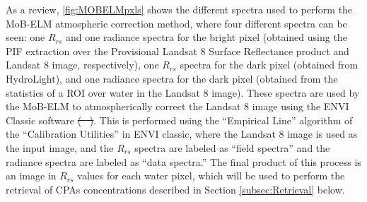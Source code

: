 \documentclass[onecolumn,3p,letterpaper,11pt]{elsarticle} %
\providecommand{\DIFaddtex}[1]{{\protect\color{blue}\uwave{#1}}} %
\providecommand{\DIFdeltex}[1]{{\protect\color{red}\sout{#1}}}                      %
\providecommand{\DIFaddbegin}{} %
\providecommand{\DIFaddend}{} %
\providecommand{\DIFdelbegin}{} %
\providecommand{\DIFdelend}{} %
\providecommand{\DIFadd}[1]{\texorpdfstring{\DIFaddtex{#1}}{#1}} %
\providecommand{\DIFdel}[1]{\texorpdfstring{\DIFdeltex{#1}}{}} %
\begin{document}
As a review, \autoref{fig:MOBELMpxls} shows the different spectra used to perform the MoB-ELM atmospheric correction method, where four different spectra can be seen: one $R_{rs}$ and one radiance spectra for the bright pixel (obtained using the PIF extraction over the Provisional Landsat 8 Surface Reflectance product and Landsat 8 image, respectively), one $R_{rs}$ spectra for the dark pixel (obtained from HydroLight), and one radiance spectra for the dark pixel (obtained from the statistics of a ROI over water in the Landsat 8 image). These spectra are used by the MoB-ELM to atmospherically correct the Landsat 8 image using the ENVI Classic software \DIFdelbegin \DIFdel{(\mbox{%
\cite{ENVIUserGuide}}%
)}\DIFdelend \DIFaddbegin \DIFadd{\mbox{%
\citep{ENVIUserGuide}}%
}\DIFaddend . This is performed using the ``Empirical Line'' algorithm of the ``Calibration Utilities'' in ENVI classic, where the Landsat 8 image is used as the input image, and the $R_{rs}$ spectra are labeled as ``field spectra'' and the radiance spectra are labeled as ``data spectra.'' The final product of this process is an image in $R_{rs}$ values for each water pixel, which will be used to perform the retrieval of CPAs concentrations described in Section \ref{subsec:Retrieval} below. 
\DIFdelbegin %

\DIFdelend %
\end{document}
